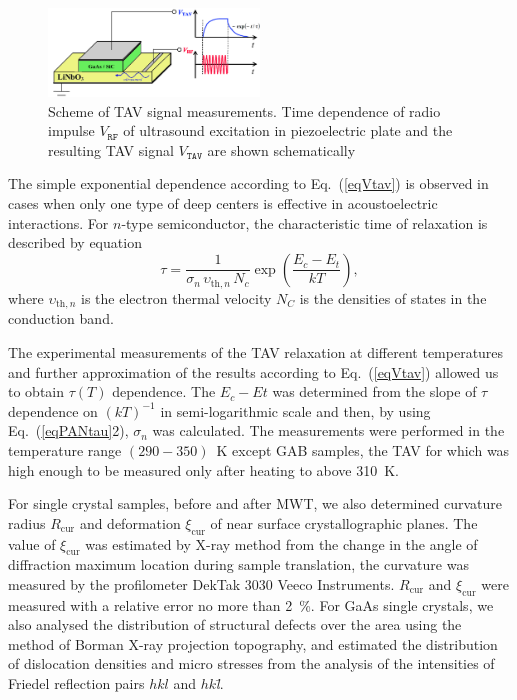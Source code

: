 \documentclass[%
 aip,jap,
 amsmath,amssymb,
 reprint,%
]{revtex4-1}
\begin{document}
\begin{figure}
\includegraphics[width=0.5\textwidth]{fig2}
\caption{\label{figTAV}
Scheme of TAV signal  measurements.
Time dependence of radio impulse $V_\mathtt{RF}$ of ultrasound excitation in piezoelectric plate and the resulting TAV signal $V_\mathtt{TAV}$ are shown schematically
}%
\end{figure}

The simple exponential dependence according to Eq.~(\ref{eqVtav}) is observed in cases when only one type of deep centers is effective in acoustoelectric interactions.
For $n$-type semiconductor, the characteristic time of relaxation is described by equation \cite{OstrovPAN,OstrovskiiSST}
\begin{equation}\label{eqPANtau}
  \tau=\frac{1}{\sigma_n\,\upsilon_{\mathrm{th},n}\,N_c}\exp\left(\frac{E_c-E_t}{kT}\right),
\end{equation}
where
$\upsilon_{\mathrm{th},n}$ is the electron thermal velocity
$N_C$ is the densities of states in the conduction band.



The experimental measurements of the TAV relaxation at different temperatures and further approximation of the results according to Eq.~(\ref{eqVtav})
allowed us to obtain $\tau(T)$ dependence.
The $E_c-Et$ was determined from the slope of $\tau$ dependence on $(kT)^{-1}$ in semi-logarithmic scale
and then, by using Eq.~(\ref{eqPANtau}2), $\sigma_n$ was calculated.
The measurements were performed in the temperature range $(290-350)$~K except GAB samples,
the TAV for which was high enough to be measured only after heating to above 310~K.

For single crystal samples,  before and after MWT, we also determined curvature radius $R_\mathrm{cur}$
and deformation $\xi_\mathrm{cur}$ of near surface crystallographic planes.
The value of  $\xi_\mathrm{cur}$ was estimated by X-ray method from the change in the angle of diffraction
maximum location  during sample translation,\cite{Godwod}
the curvature was measured by the profilometer DekTak 3030 Veeco Instruments.
$R_\mathrm{cur}$ and $\xi_\mathrm{cur}$ were measured with a relative error no more than 2~\%.
For GaAs single crystals, we also analysed the distribution of structural defects over the area using the method of
Borman X-ray projection topography, and estimated the distribution of dislocation  densities and micro stresses from the
analysis of the intensities of Friedel reflection pairs $hkl$ and $hk$\emph{\={l}}.
\end{document}
